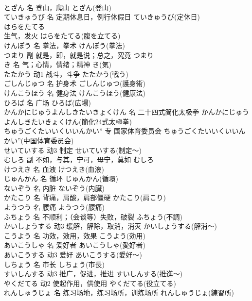 \documentclass[8pt]{extreport}
\begin{document}
\begin{CJK}{UTF8}{min}
\\	とざん	名	登山，爬山	とざん(登山)	
\\	ていきゅうび	名	定期休息日，例行休假日	ていきゅうび(定休日)	
\\	はらをたてる	
\\	生气，发火	はらをたてる(腹を立てる)	
\\	けんぽう	名	拳法，拳术	けんぽう(拳法)	
\\	つまり	副	就是，即，就是说；总之，究竟	つまり	
\\	き	名	气；心情，情绪；精神	き(気)	
\\	たたかう	动1	战斗，斗争	たたかう(戦う)	
\\	ごしんじゅつ	名	护身术	ごしんじゅつ(護身術)	
\\	けんこうほう	名	健身法	けんこうほう(健康法)	
\\	ひろば	名	广场	ひろば(広場)	
\\	かんかにじゅうよんしきたいきょくけん	名	二十四式简化太极拳	かんかにじゅうよんしきたいきょくけん(簡化24式太極拳)	
\\	ちゅうごくたいいくいいんかい”	专	国家体育委员会	ちゅうごくたいいくいいんかい”(中国体育委员会)	
\\	せいていする	动3	制定	せいていする(制定～)	
\\	むしろ	副	不如，与其，宁可，毋宁，莫如	むしろ	
\\	けつえき	名	血液	けつえき(血液)	
\\	じゅんかん	名	循环	じゅんかん(循環)	
\\	ないぞう	名	内脏	ないぞう(内臓)	
\\	かたこり	名	背痛，肩酸，肩部僵硬	かたこり(肩こり)	
\\	ようつう	名	腰痛	ようつう(腰痛)	
\\	ふちょう	名	不顺利；（会谈等）失败，破裂	ふちょう(不調)	
\\	かいしょうする	动3	缓解，解除，取消，消灭	かいしょうする(解消～)	
\\	こうよう	名	功效，效用，效果	こうよう(効用)	
\\	あいこうしゃ	名	爱好者	あいこうしゃ(愛好者)	
\\	あいこうする	动3	爱好	あいこうする(愛好～)	
\\	しちょう	名	市长	しちょう(市長)	
\\	すいしんする	动3	推广，促进，推进	すいしんする(推進～)	
\\	やくだてる	动2	使起作用，供使用	やくだてる(役立てる)	
\\	れんしゅうじょ	名	练习场地，练习场所，训练场所	れんしゅうじょ(練習所)	

\end{CJK}
\end{document}

